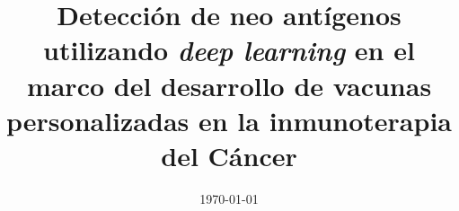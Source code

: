 \documentclass[a4paper, 11pt, oneside]{Thesis}  %
\begin{document}
	
	
\frontmatter      %



\title  {Detección de neo antígenos utilizando \textit{deep learning} en el marco del desarrollo de vacunas personalizadas en la inmunoterapia del Cáncer}
\addresses  {\groupname\\\deptname\\\univname}  %
\date       {\today}
\subject    {}
\keywords   {}

\maketitle


\fancyhead{}  %
\rhead{\thepage}  %
\lhead{}  %





\pagestyle{fancy}  %
\end{document}
